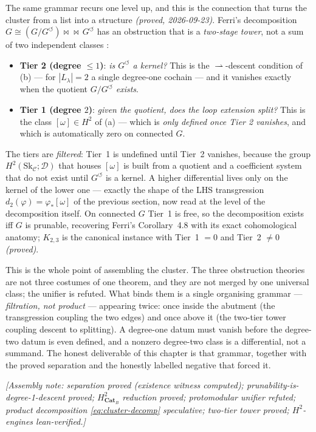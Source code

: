 \documentclass[11pt]{report}
\theoremstyle{plain}
\theoremstyle{definition}
\theoremstyle{remark}
\newcommand{\assemble}[1]{\par\noindent\textit{[Assembly note: #1]}\par}
\newcommand{\Cat}{\mathbf{Cat}}
\newcommand{\Hcoh}{H^2}
\begin{document}
The same grammar recurs one level up, and this is the connection that turns the
cluster from a list into a structure \emph{(proved, 2026-09-23)}. Ferri's
decomposition $G\cong(G/G^{\circlearrowleft})\bowtie\!\!\!\!\bowtie\,
G^{\circlearrowleft}$ has an obstruction that is a \emph{two-stage tower}, not a
sum of two independent classes \cite{cl-twotier}:
\begin{itemize}
\item \textbf{Tier 2 (degree $\le1$)}: \emph{is $G^{\circlearrowleft}$ a kernel?}
This is the $\rightharpoonup$-descent condition of (b) --- for $|L_\lambda|=2$ a
single degree-one cochain --- and it vanishes exactly when the quotient
$G/G^{\circlearrowleft}$ \emph{exists}.
\item \textbf{Tier 1 (degree $2$)}: \emph{given the quotient, does the loop
extension split?} This is the class $[\omega]\in\Hcoh$ of (a) --- which is
\emph{only defined once Tier 2 vanishes}, and which is automatically zero on
connected $G$.
\end{itemize}
The tiers are \emph{filtered}: Tier~1 is undefined until Tier~2 vanishes, because
the group $\Hcoh(\mathrm{Sk}_{\mathcal C};\mathcal D)$ that houses $[\omega]$ is
built from a quotient and a coefficient system that do not exist until
$G^{\circlearrowleft}$ is a kernel. A higher differential lives only on the kernel
of the lower one --- exactly the shape of the LHS transgression
$d_2(\varphi)=\varphi_*[\omega]$ of the previous section, now read at the level of
the decomposition itself. On connected $G$ Tier~1 is free, so the decomposition
exists iff $G$ is prunable, recovering Ferri's Corollary~4.8 with its exact
cohomological anatomy; $K_{2,3}$ is the canonical instance with Tier~1 $=0$ and
Tier~2 $\neq0$ \emph{(proved)}.

This is the whole point of assembling the cluster. The three obstruction theories
are not three costumes of one theorem, and they are not merged by one universal
class; the unifier is refuted. What binds them is a single organising grammar ---
\emph{filtration, not product} --- appearing twice: once inside the abutment (the
transgression coupling the two edges) and once above it (the two-tier tower
coupling descent to splitting). A degree-one datum must vanish before the
degree-two datum is even defined, and a nonzero degree-two class is a
differential, not a summand. The honest deliverable of this chapter is that
grammar, together with the proved separation and the honestly labelled negative
that forced it.
\assemble{separation proved (existence witness computed); prunability-is-degree-1-descent proved; $\Hcoh_{\Cat_B}$ reduction proved; protomodular unifier refuted; product decomposition \eqref{eq:cluster-decomp} speculative; two-tier tower proved; $\Hcoh$-engines lean-verified.}
\end{document}

